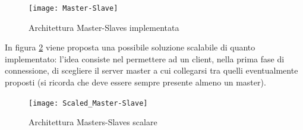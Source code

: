 \documentclass[paper=a4, fontsize=11pt]{scrartcl} %
\numberwithin{equation}{section} %
\numberwithin{figure}{section} %
\numberwithin{table}{section} %
\begin{document}
\begin{figure}
\centering
\texttt{[image: Master-Slave]}
\caption{Architettura Master-Slaves implementata}
\label{Master-Slave}
\end{figure}

In figura \ref{Scaled-Master-Slave} viene proposta una possibile soluzione scalabile di quanto implementato: l'idea consiste nel permettere ad un client, nella prima fase di connessione, di scegliere il server master a cui collegarsi tra quelli eventualmente proposti (si ricorda che deve essere sempre presente almeno un master).

\begin{figure}
\centering
\texttt{[image: Scaled\_Master-Slave]}
\caption{Architettura Masters-Slaves scalare}
\label{Scaled-Master-Slave}
\end{figure}
\end{document}
